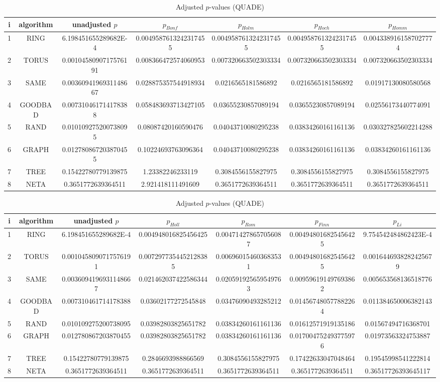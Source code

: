 \documentclass[a4paper,10pt]{article}
\begin{document}
\begin{landscape}
\begin{table}[!htp]
\centering\scriptsize
\caption{Adjusted $p$-values (QUADE)}
\begin{tabular}{ccccccc}
i&algorithm&unadjusted $p$&$p_{Bonf}$&$p_{Holm}$&$p_{Hoch}$&$p_{Homm}$\\
\hline
1& RING&6.198451655289682E-4&0.0049587613242317455&0.0049587613242317455&0.0049587613242317455&0.0043389161587027774\\
2& TORUS&0.0010458090717576191&0.008366472574060953&0.007320663502303334&0.007320663502303334&0.007320663502303334\\
3& SAME&0.0036094196931148667&0.028875357544918934&0.0216565181586892&0.0216565181586892&0.01917130080580568\\
4& GOODBAD&0.007310461714178388&0.058483693713427105&0.03655230857089194&0.03655230857089194&0.02556173440774091\\
5& RAND&0.010109275200738095&0.08087420160590476&0.04043710080295238&0.03834260161161136&0.030327825602214288\\
6& GRAPH&0.012780867203870455&0.10224693763096364&0.04043710080295238&0.03834260161161136&0.03834260161161136\\
7& TREE&0.15422780779139875&1.23382246233119&0.3084556155827975&0.3084556155827975&0.3084556155827975\\
8& NETA&0.3651772639364511&2.921418111491609&0.3651772639364511&0.3651772639364511&0.3651772639364511\\
\hline
\end{tabular}
\end{table}

\begin{table}[!htp]
\centering\scriptsize
\caption{Adjusted $p$-values (QUADE)}
\begin{tabular}{ccccccc}
i&algorithm&unadjusted $p$&$p_{Holl}$&$p_{Rom}$&$p_{Finn}$&$p_{Li}$\\
\hline
1& RING&6.198451655289682E-4&0.004948016825456425&0.004714278657056087&0.004948016825456425&9.754542484862423E-4\\
2& TORUS&0.0010458090717576191&0.0072977354452128385&0.006960154603683531&0.004948016825456425&0.0016446938282425679\\
3& SAME&0.0036094196931148667&0.021462037422586344&0.020591925659549763&0.009596191497693862&0.005653568136518776\\
4& GOODBAD&0.007310461714178388&0.03602177272545848&0.03476090493285212&0.014567480577882264&0.011384650006382143\\
5& RAND&0.010109275200738095&0.03982803825651782&0.03834260161161136&0.01612571919135186&0.01567494716368701\\
6& GRAPH&0.012780867203870455&0.03982803825651782&0.03834260161161136&0.017004752493775976&0.01973563324753887\\
7& TREE&0.15422780779139875&0.2846693988866569&0.3084556155827975&0.17422633047048464&0.19545998541222814\\
8& NETA&0.3651772639364511&0.3651772639364511&0.3651772639364511&0.3651772639364511&0.36517726393645117\\
\hline
\end{tabular}
\end{table}

\end{landscape}
\end{document}
